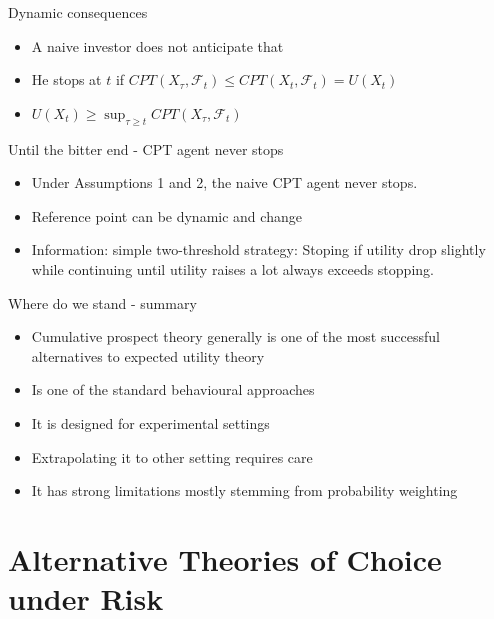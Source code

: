 \documentclass[11pt, aspectratio=169]{beamer}
\begin{document}
\begin{frame}{Dynamic consequences}
    \begin{itemize}
        \item A naive investor does not anticipate that\medskip
        \item He stops at $t$ if $CPT(X_\tau,\mathcal{F}_t) \leq CPT(X_t,\mathcal{F}_t)=U(X_t)$\medskip
        \item $U(X_t) \geq \sup_{\tau \geq t} CPT(X_\tau,\mathcal{F}_t)$
    \end{itemize}
\end{frame}

\begin{frame}{Until the bitter end - CPT agent never stops}
    \begin{theorem}
        \begin{itemize}
        \item Under Assumptions 1 and 2, the naive CPT agent never stops.\medskip
        \item Reference point can be dynamic and change\medskip
        \item Information: simple two-threshold strategy:
        Stoping if utility drop slightly while continuing until utility raises a lot always exceeds stopping.\medskip
	\end{itemize}
\end{theorem}
\end{frame}

\begin{frame}{Where do we stand - summary}
    \begin{itemize}
        \item Cumulative prospect theory generally is one of the most successful alternatives to expected utility theory\medskip
        \item Is one of the standard behavioural approaches\medskip
        \item It is designed for experimental settings\medskip
        \item Extrapolating it to other setting requires care\medskip
        \item It has strong limitations mostly stemming from probability weighting\medskip
    \end{itemize}
\end{frame}




\section{Alternative Theories of Choice under Risk}
\end{document}
